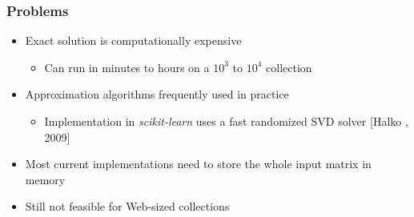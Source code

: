 \documentclass{beamer}
\begin{document}

\begin{frame} 
  \frametitle{Problems}
  
  \begin{itemize}
  \item Exact solution is computationally expensive
    \begin{itemize}
    \item Can run in minutes to hours on a $10^3$ to $10^4$ collection
    \end{itemize}
  \item Approximation algorithms frequently used in practice
    \begin{itemize}
    \item Implementation in {\it scikit-learn} uses a fast randomized SVD solver [Halko , 2009]
    \end{itemize}  
  \item Most current implementations need to store the whole input matrix in memory
  \item Still not feasible for Web-sized collections
  \end{itemize}

\end{frame}


\end{document}
